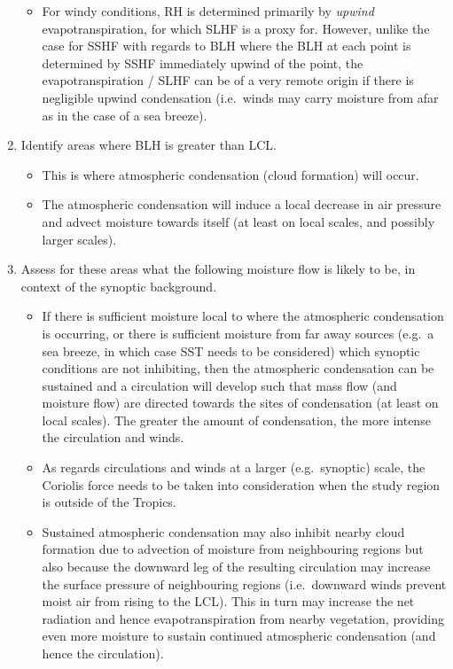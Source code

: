 \begin{enumerate}
\begin{itemize}
		\item For windy conditions, \ac{RH} is determined primarily by \textit{upwind} evapotranspiration, for which \ac{SLHF} is a proxy for. However, unlike the case for \ac{SSHF} with regards to \ac{BLH} where the \ac{BLH} at each point is determined by \ac{SSHF} immediately upwind of the point, the evapotranspiration / \ac{SLHF} can be of a very remote origin if there is negligible upwind condensation (i.e.\ winds may carry moisture from afar as in the case of a sea breeze).
	\end{itemize}
	\item Identify areas where \ac{BLH} is greater than \ac{LCL}.
	\begin{itemize}
		\item This is where atmospheric condensation (cloud formation) will occur.
		\item The atmospheric condensation will induce a local decrease in air pressure and advect moisture towards itself (at least on local scales, and possibly larger scales).
	\end{itemize}
	\item Assess for these areas what the following moisture flow is likely to be, in context of the synoptic background.
	\begin{itemize}
		\item If there is sufficient moisture local to where the atmospheric condensation is occurring, or there is sufficient moisture from far away sources (e.g.\ a sea breeze, in which case \ac{SST} needs to be considered) which synoptic conditions are not inhibiting, then the atmospheric condensation can be sustained and a circulation will develop such that mass flow (and moisture flow) are directed towards the sites of condensation (at least on local scales). The greater the amount of condensation, the more intense the circulation and winds.
		\item As regards circulations and winds at a larger (e.g.\ synoptic) scale, the Coriolis force needs to be taken into consideration when the study region is outside of the Tropics.
		\item Sustained atmospheric condensation may also inhibit nearby cloud formation due to advection of moisture from neighbouring regions but also because the downward leg of the resulting circulation may increase the surface pressure of neighbouring regions (i.e.\ downward winds prevent moist air from rising to the \ac{LCL}). This in turn may increase the net radiation and hence evapotranspiration from nearby vegetation, providing even more moisture to sustain continued atmospheric condensation (and hence the circulation).

\end{itemize}
\end{enumerate}
